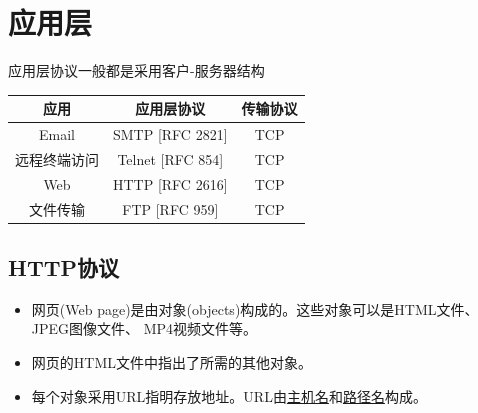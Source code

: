 
\section{应用层}
应用层协议一般都是采用客户-服务器结构
\begin{center}
\begin{tabular}{|c|c|c|}\hline
应用 & 应用层协议 & 传输协议\\\hline
Email & SMTP [RFC 2821] & TCP \\\hline
远程终端访问 & Telnet [RFC 854] & TCP\\\hline
Web & HTTP [RFC 2616] & TCP\\\hline
文件传输 & FTP [RFC 959] & TCP\\\hline
\end{tabular}
\end{center}

\subsection{HTTP协议}
\begin{itemize}
\item 网页(Web page)是由对象(objects)构成的。这些对象可以是HTML文件、 JPEG图像文件、 MP4视频文件等。
\item 网页的HTML文件中指出了所需的其他对象。
\item 每个对象采用URL指明存放地址。URL由\underline{主机名}和\underline{路径名}构成。
\end{itemize}

